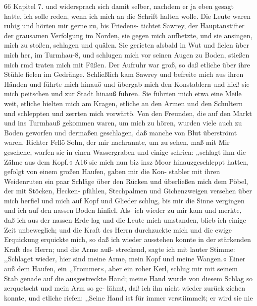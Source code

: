 66 Kapitel 7.
und widersprach sich damit selber, nachdem er ja eben gesagt
hatte, ich solle reden, wenn ich mich an die Schrift halten wolle.
Die Leute waren ruhig und hörten mir gerne zu, bis Friedens-
tichtet Sawrey, der Hauptanstifter der grausamen Verfolgung
im Norden, sie gegen mich aufhetzte, und sie ansingen, mich zu
stoßen, schlagen und quälen. Sie gerieten alsbald in Wut und
fielen über mich her, im Turmhau-8, und schlugen mich vor seinen
Augen zu Boden, stießen mich rmd traten mich mit Füßen. Der
Aufruhr war groß, so daß etliche über ihre Stühle fielen im
Gedränge. Schließlich kam Sawrey und befreite mich aus ihren
Händen und führte mich hinauö und übergab mich den Konstablern
und hieß sie mich peitschen und zur Stadt hinauß führen. Sie
führten mich etwa eine Meile weit, etliche hielten mich am Kragen,
etliche an den Armen und den Schultern und schleppten und
zerrten mich vorwärtö. Von den Freunden, die auf den Markt
und ins Turmhauß gekommen waren, um mich zu hören, wurden
viele auch zu Boden geworfen und dermaßen geschlagen, daß
manche von Blut überströmt waren. Richter Fellö Sohn, der
mir nachrannte, um zu sehen, maß mit Mir geschehe, warfen sie
in einen Wassergraben und einige schrien: ,,schlagt ihm die Zähne
aus dem Kopf.« A16 sie mich nun biz insz Moor hinauzgeschleppt
hatten, gefolgt von einem großen Haufen, gaben mir die Kon-
stabler mit ihren Weidenruten ein paar Schläge über den
Rücken und überließen mich dem Pöbel, der mit Stöcken, Hecken-
pfählen, Stechpalmen und Gichenzweigen versehen über mich
herfiel und mich auf Kopf und Glieder schlug, bis mir die
Sinne vergingen und ich auf den nassen Boden hinfiel. Als-
ich wieder zu mir kam und merkte, daß ich aus der nassen
Erde lag und die Leute mich umstanden, blieb ich einige
Zeit unbeweglich; und die Kraft des Herrn durchzuckte mich und
die ewige Erquickung erquickte mich, so daß ich wieder ausstehen
konnte in der stärkenden Kraft des Herrn; und die Arme auß-
streckend, sagte ich mit lauter Stimme: ,,Schlaget wieder, hier
sind meine Arme, mein Kopf und meine Wangen.« Einer auß
dem Haufen, ein ,,Frommer«, aber ein roher Kerl, schlug mir
mit seinem Stab genade auf die ausgestreckte Hand; meine Hand
wurde von diesem Schlag so zerquetscht und mein Arm so ge-
lähmt, daß ich ihn nicht wieder zurück ziehen konnte, und etliche
riefen: ,,Seine Hand ist für immer verstiimmelt; er wird sie nie



